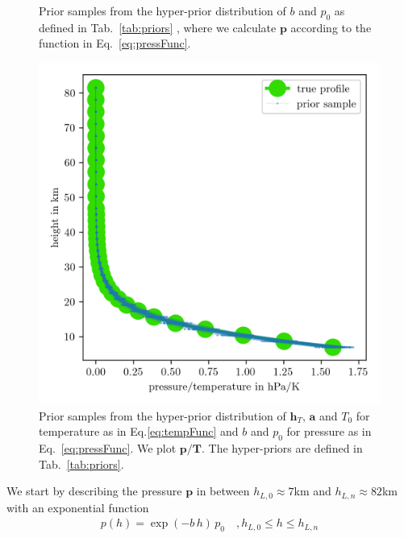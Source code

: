 \begin{figure}[ht!]
	\centering
	
	\caption[Prior Samples of $\bm{p}$ according to the respective hyper-prior distribution.]{Prior samples from the hyper-prior distribution of $b$ and $p_0$ as defined in Tab.~\ref{tab:priors} , where we calculate $\bm{p}$ according to the function in Eq.~\ref{eq:pressFunc}.}
	\label{fig:PriorPress}
\end{figure}
\begin{figure}[ht!]
	\centering
	\includegraphics{PriorTempOverPostMeanSigm.png}
	\caption[Prior Samples of $\bm{p}/\bm{T}$ according to the respective hyper-prior distribution.]{Prior samples from the hyper-prior distribution of $\bm{h}_T$, $\bm{a}$ and $T_0$ for temperature as in Eq.\ref{eq:tempFunc} and $b$ and $p_0$ for pressure as in Eq.~\ref{eq:pressFunc}. We plot $\bm{p}/\bm{T}$. The hyper-priors are defined in Tab.~\ref{tab:priors}.}
	\label{fig:PriorPressOverTemp}
\end{figure}
We start by describing the pressure $\bm{p}$ in between $h_{L,0} \approx 7$km and $h_{L,n} \approx 82$km with an exponential function
\begin{align}
	p(h) =
	\exp \left( -b \, h \right)   \,  p_0 \quad , \text{$h_{L,0}  \leq h \leq h_{L,n}$}
	\label{eq:pressFunc}
\end{align}
